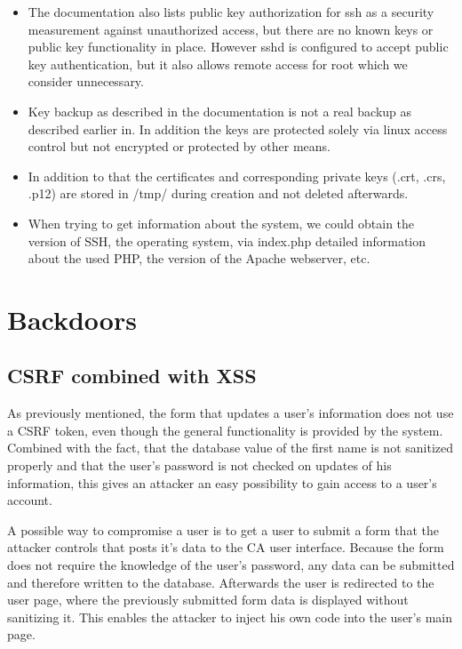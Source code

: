 \documentclass{article}
\begin{document}
\begin{itemize}
\item The documentation also lists public key authorization for ssh as a security measurement against unauthorized access, but there are no known keys or public key functionality in place. However sshd is configured to accept public key authentication, but it also allows remote access for root which we consider unnecessary.

\item Key backup as described in the documentation is not a real backup as described earlier in. In addition the keys are protected solely via linux access control but not encrypted or protected by other means.

\item In addition to that the certificates and corresponding private keys (.crt, .crs, .p12) are stored in /tmp/ during creation and not deleted afterwards. 

\item When trying to get information about the system, we could obtain the version of SSH, the operating system, via index.php detailed information about the used PHP, the version of the Apache webserver, etc.
\end{itemize}

\section{Backdoors}
\subsection{CSRF combined with XSS}
As previously mentioned, the form that updates a user's information does not use a CSRF token, even though the general functionality is provided by the system. Combined with the fact, that the database value of the first name is not sanitized properly and that the user's password is not checked on updates of his information, this gives an attacker an easy possibility to gain access to a user's account.

A possible way to compromise a user is to get a user to submit a form that the attacker controls that posts it's data to the CA user interface. Because the form does not require the knowledge of the user's password, any data can be submitted and therefore written to the database. Afterwards the user is redirected to the user page, where the previously submitted form data is displayed without sanitizing it. This enables the attacker to inject his own code into the user's main page.
\end{document}
